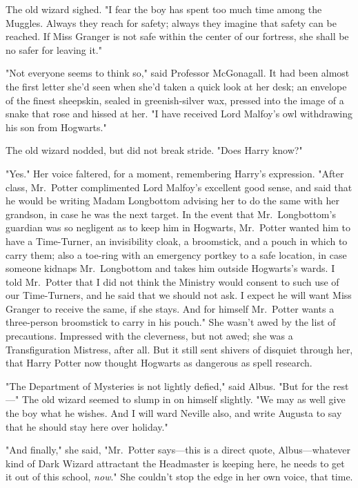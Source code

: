 The old wizard sighed. "I fear the boy has spent too much time among the 
Muggles. Always they reach for safety; always they imagine that safety can be 
reached. If Miss Granger is not safe within the center of our fortress, she 
shall be no safer for leaving it."

"Not everyone seems to think so," said Professor McGonagall. It had been almost 
the first letter she'd seen when she'd taken a quick look at her desk; an 
envelope of the finest sheepskin, sealed in greenish-silver wax, pressed into 
the image of a snake that rose and hissed at her. "I have received Lord 
Malfoy's owl withdrawing his son from Hogwarts."

The old wizard nodded, but did not break stride. "Does Harry know?"

"Yes." Her voice faltered, for a moment, remembering Harry's expression. "After 
class, Mr.~Potter complimented Lord Malfoy's excellent good sense, and said 
that he would be writing Madam Longbottom advising her to do the same with her 
grandson, in case he was the next target. In the event that Mr.~Longbottom's 
guardian was so negligent as to keep him in Hogwarts, Mr.~Potter wanted him to 
have a Time-Turner, an invisibility cloak, a broomstick, and a pouch in which 
to carry them; also a toe-ring with an emergency portkey to a safe location, in 
case someone kidnaps Mr.~Longbottom and takes him outside Hogwarts's wards. I 
told Mr.~Potter that I did not think the Ministry would consent to such use of 
our Time-Turners, and he said that we should not ask. I expect he will want 
Miss Granger to receive the same, if she stays. And for himself Mr.~Potter 
wants a three-person broomstick to carry in his pouch." She wasn't awed by the 
list of precautions. Impressed with the cleverness, but not awed; she was a 
Transfiguration Mistress, after all. But it still sent shivers of disquiet 
through her, that Harry Potter now thought Hogwarts as dangerous as spell 
research.

"The Department of Mysteries is not lightly defied," said Albus. "But for the 
rest---" The old wizard seemed to slump in on himself slightly. "We may as well 
give the boy what he wishes. And I will ward Neville also, and write Augusta to 
say that he should stay here over holiday."

"And finally," she said, "Mr.~Potter says---this is a direct quote, 
Albus---whatever kind of Dark Wizard attractant the Headmaster is keeping here, 
he needs to get it out of this school, \emph{now}." She couldn't stop the edge 
in her own voice, that time.

